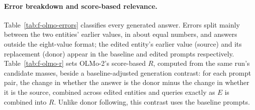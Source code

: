 \paragraph{Error breakdown and score-based relevance.} Table~\ref{tab:f-olmo-errors} classifies every generated answer. Errors split mainly between the two entities' earlier values, in about equal numbers, and answers outside the eight-value format; the edited entity's earlier value (source) and its replacement (donor) appear in the baseline and edited prompts respectively. Table~\ref{tab:f-olmo-r} sets OLMo-2's score-based $R$, computed from the same run's candidate masses, beside a baseline-adjusted generation contrast: for each prompt pair, the change in whether the answer is the donor minus the change in whether it is the source, combined across edited entities and queries exactly as $E$ is combined into $R$. Unlike donor following, this contrast uses the baseline prompts.

\begin{table}[h]
\caption{OLMo-2-7B-Instruct generated answers on the Experiment 1 confirmation set, by construction and prompt version (1,536 prompts each): correct, the edited entity's earlier value (source), its replacement (donor), the other entity's current or earlier value, another of the eight values, or no valid value.}
\label{tab:f-olmo-errors}
\begin{center}
\end{center}
\end{table}

